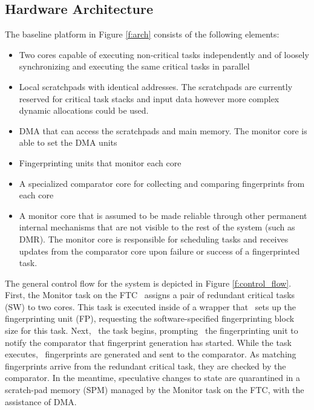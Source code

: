 \subsection{Hardware Architecture}

The baseline platform in Figure \ref{f:arch} consists of the following elements:
\begin{itemize}
\item{Two cores capable of executing non-critical tasks independently and of loosely synchronizing and executing the same critical tasks in parallel}
\item{Local scratchpads with identical addresses. The scratchpads are currently reserved for critical task stacks and input data however more complex dynamic allocations could be used. }
\item{DMA that can access the scratchpads and main memory. The monitor core is able to set the DMA units}
\item{Fingerprinting units that monitor each core}
\item{A specialized comparator core for collecting and comparing fingerprints from each core}
\item{A monitor core that is assumed to be made reliable through other permanent internal mechanisms that are not visible to the rest of the system (such as DMR). The monitor core is responsible for scheduling tasks and receives updates from the comparator core upon failure or success of a fingerprinted task.}
\end{itemize}


The general control flow for the system is depicted in Figure \ref{f:control_flow}.
	First, the Monitor task on the FTC ~assigns a pair of redundant critical tasks (SW) to two cores.
	This task is executed inside of a wrapper that ~sets up the fingerprinting unit (FP), requesting the software-specified fingerprinting block size for this task.
	Next, ~the task begins, prompting ~the fingerprinting unit to notify the comparator that fingerprint generation has started.
	While the task executes, ~fingerprints are generated and sent to the comparator.
	As matching fingerprints arrive from the redundant critical task, they are checked by the comparator.
	In the meantime, speculative changes to state are quarantined in a scratch-pad memory (SPM) managed by the Monitor task on the FTC, with the assistance of DMA.
	
